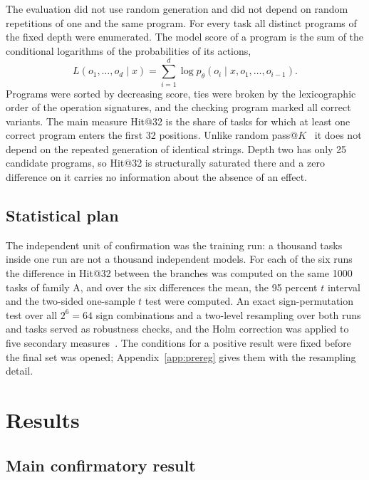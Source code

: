 \documentclass{zapiski}
\begin{document}
The evaluation did not use random generation and did not depend on random repetitions
of one and the same program. For every task all distinct programs of the fixed depth
were enumerated. The model score of a program is the sum of the conditional logarithms
of the probabilities of its actions,
\begin{equation}
L(o_1, \ldots, o_d \mid x) = \sum_{i=1}^{d} \log p_\theta\!\left(o_i \mid x, o_1,
\ldots, o_{i-1}\right).
\label{eq:score}
\end{equation}
Programs were sorted by decreasing score, ties were broken by the lexicographic order
of the operation signatures, and the checking program marked all correct variants. The
main measure Hit@32 is the share of tasks for which at least one correct program enters
the first 32 positions. Unlike random pass@$K$~\cite{chen2021codex} it does not depend
on the repeated generation of identical strings. Depth two has only 25 candidate
programs, so Hit@32 is structurally saturated there and a zero difference on it carries
no information about the absence of an effect.

\subsection{Statistical plan}

The independent unit of confirmation was the training run: a thousand tasks inside one
run are not a thousand independent models. For each of the six runs the difference in
Hit@32 between the branches was computed on the same 1000 tasks of family A, and over
the six differences the mean, the 95 percent $t$ interval and the two-sided one-sample
$t$ test were computed. An exact sign-permutation test over all $2^6 = 64$ sign
combinations and a two-level resampling over both runs and tasks served as robustness
checks, and the Holm correction was applied to five secondary
measures~\cite{efron1993bootstrap,holm1979procedure}. The conditions for a positive
result were fixed before the final set was opened; Appendix~\ref{app:prereg} gives them
with the resampling detail.

\section{Results}
\label{sec:results}

\subsection{Main confirmatory result}
\end{document}
